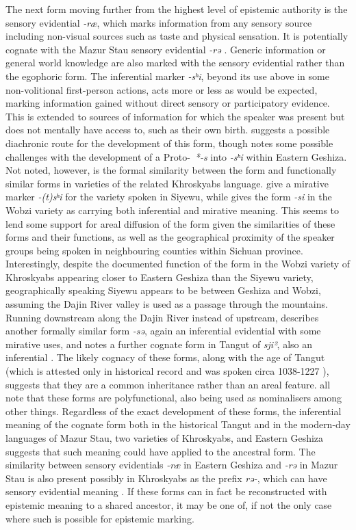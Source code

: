 The next form moving further from the highest level of epistemic authority is the sensory evidential \textit{-ræ}, which marks information from any sensory source including non-visual sources such as taste and physical sensation. It is potentially cognate with the Mazur Stau sensory evidential \textit{-rə} \cite[347]{Gates2021}. Generic information or general world knowledge are also marked with the sensory evidential rather than the egophoric form. The inferential marker \textit{-sʰi}, beyond its use above in some non-volitional first-person actions, acts more or less as would be expected, marking information gained without direct sensory or participatory evidence. This is extended to sources of information for which the speaker was present but does not mentally have access to, such as their own birth. \cite[589]{Honkasalo2019} suggests a possible diachronic route for the development of this form, though notes some possible challenges with the development of a Proto-\lfam\ \textit{*-s} into \textit{-sʰi} within Eastern Geshiza. Not noted, however, is the formal similarity between the form and functionally similar forms in varieties of the related Khroskyabs language.  give a mirative marker \textit{-(t)sʰi} for the variety spoken in Siyewu, while  gives the form \textit{-si} in the Wobzi variety as carrying both inferential and mirative meaning. This seems to lend some support for areal diffusion of the form given the similarities of these forms and their functions, as well as the geographical proximity of the speaker groups being spoken in neighbouring counties within Sichuan province. Interestingly, despite the documented function of the form in the Wobzi variety of Khroskyabs appearing closer to Eastern Geshiza than the Siyewu variety, geographically speaking Siyewu appears to be between Geshiza and Wobzi, assuming the Dajin River valley is used as a passage through the mountains. Running downstream along the Dajin River instead of upstream,  describes another formally similar form \textit{-sə}, again an inferential evidential with some mirative uses, and notes a further cognate form in Tangut of \textit{sji²}, also an inferential \cite{Lai2020}. The likely cognacy of these forms, along with the age of Tangut (which is attested only in historical record and was spoken circa 1038-1227 \cite{Lai2020}), suggests that they are a common inheritance rather than an areal feature.  all note that these forms are polyfunctional, also being used as nominalisers among other things. Regardless of the exact development of these forms, the inferential meaning of the cognate form both in the historical Tangut and in the modern-day languages of Mazur Stau, two varieties of Khroskyabs, and Eastern Geshiza suggests that such meaning could have applied to the ancestral form. The similarity between sensory evidentials \textit{-ræ} in Eastern Geshiza and \textit{-rə} in Mazur Stau is also present possibly in Khroskyabs as the prefix \textit{rə-}, which can have sensory evidential meaning \cite{Lai2017}. If these forms can in fact be reconstructed with epistemic meaning to a shared ancestor, it may be one of, if not the only case where such is possible for epistemic marking.

